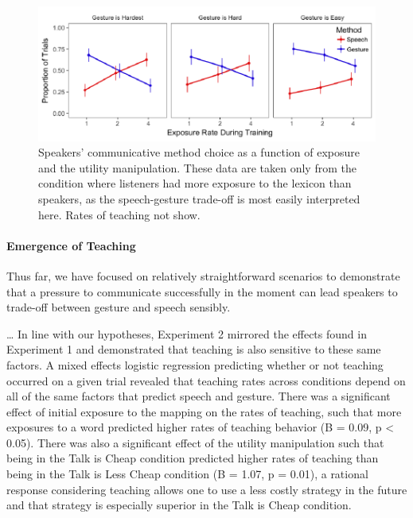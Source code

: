 \documentclass[10pt, letterpaper]{article}
\newenvironment{CodeChunk}{}{}
\begin{document}
\begin{CodeChunk}
\begin{figure}[H]

{\centering \includegraphics{figs/imp_speech_gesture-1} 

}

\caption[Speakers' communicative method choice as a function of exposure and the utility manipulation]{Speakers' communicative method choice as a function of exposure and the utility manipulation. These data are taken only from the condition where listeners had more exposure to the lexicon than speakers, as the speech-gesture trade-off is most easily interpreted here. Rates of teaching not show.}\label{fig:imp_speech_gesture}
\end{figure}
\end{CodeChunk}

\paragraph{Emergence of Teaching}\label{emergence-of-teaching}

Thus far, we have focused on relatively straightforward scenarios to
demonstrate that a pressure to communicate successfully in the moment
can lead speakers to trade-off between gesture and speech sensibly.

\ldots{} In line with our hypotheses, Experiment 2 mirrored the effects
found in Experiment 1 and demonstrated that teaching is also sensitive
to these same factors. A mixed effects logistic regression predicting
whether or not teaching occurred on a given trial revealed that teaching
rates across conditions depend on all of the same factors that predict
speech and gesture. There was a significant effect of initial exposure
to the mapping on the rates of teaching, such that more exposures to a
word predicted higher rates of teaching behavior (B = 0.09, p
\textless{} 0.05). There was also a significant effect of the utility
manipulation such that being in the Talk is Cheap condition predicted
higher rates of teaching than being in the Talk is Less Cheap condition
(B = 1.07, p = 0.01), a rational response considering teaching allows
one to use a less costly strategy in the future and that strategy is
especially superior in the Talk is Cheap condition.
\end{document}
